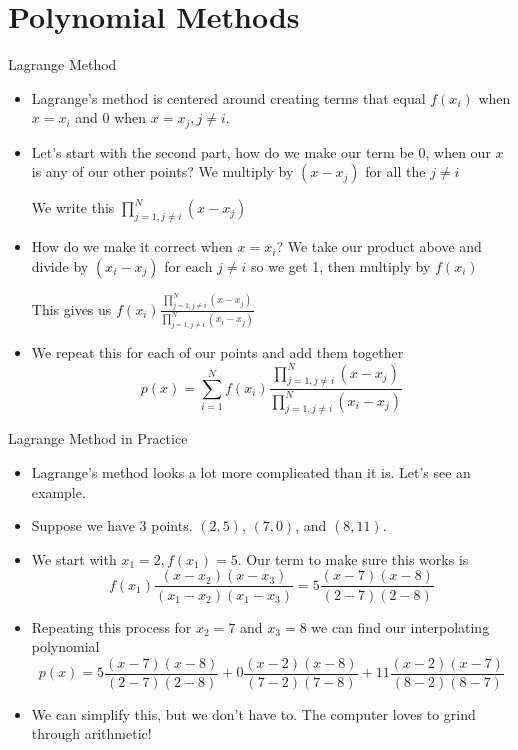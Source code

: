 {}\documentclass[letterpaper,
compress,
xcolor=x11names,
]{beamer}
\begin{document}
\section{Polynomial Methods}

\begin{frame}{Lagrange Method}
	\footnotesize
	\begin{itemize}
		\item Lagrange's method is centered around creating terms that equal $f(x_i)$ when $x=x_i$ and 0 when $x=x_j, j\neq i$.
		\item Let's start with the second part, how do we make our term be 0, when our $x$ is any of our other points? We multiply by $(x-x_j)$ for all the $j\neq i$ 
		\begin{center}
			We write this $\displaystyle\prod_{j=1, j\neq i}^{N}(x-x_j)$
		\end{center}
		\item How do we make it correct when $x=x_i$? We take our product above and divide by $(x_i-x_j)$ for each $j\neq i$ so we get 1, then multiply by $f(x_i)$
		\begin{center}
			This gives us  $\displaystyle f(x_i)\frac{\prod_{j=1, j\neq i}^{N}(x-x_j)}{\prod_{j=1, j\neq i}^{N}(x_i-x_j)}$
		\end{center}
		\item We repeat this for each of our points and add them together
		\begin{equation*}
			p(x) = \sum_{i=1}^{N}f(x_i)\frac{\prod_{j=1, j\neq i}^{N}(x-x_j)}{\prod_{j=1, j\neq i}^{N}(x_i-x_j)}
		\end{equation*}
	\end{itemize}
\end{frame}


\begin{frame}{Lagrange Method in Practice}
	\footnotesize
	\begin{itemize}
		\item Lagrange's method looks a lot more complicated than it is. Let's see an example.
		\item Suppose we have 3 points. $(2,5)$, $(7,0)$, and $(8,11)$.
		\item We start with $x_1 = 2, f(x_1) = 5$. Our term to make sure this works is 
		\begin{equation*}
			f(x_1)\frac{(x-x_2)(x-x_3)}{(x_1 - x_2)(x_1 - x_3)} = 5\frac{(x-7)(x-8)}{(2-7)(2-8)}
		\end{equation*}
		\item Repeating this process for $x_2 = 7$ and $x_3 = 8$ we can find our interpolating polynomial
		\begin{equation*}
			p(x) = 5\frac{(x-7)(x-8)}{(2-7)(2-8)} + 0\frac{(x-2)(x-8)}{(7-2)(7-8)} + 11\frac{(x-2)(x-7)}{(8-2)(8-7)}
		\end{equation*}
		\item We can simplify this, but we don't have to. The computer loves to grind through arithmetic!
	\end{itemize}
\end{frame}
\end{document}
